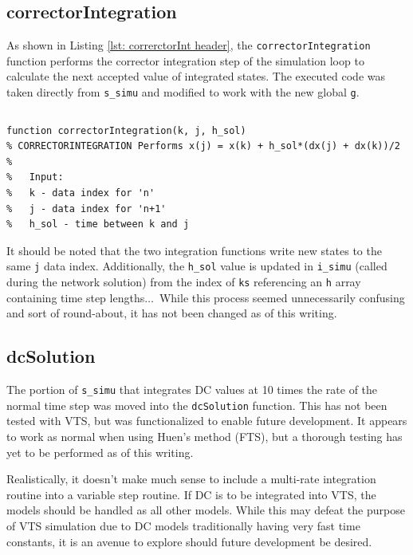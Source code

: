 \subsection{correctorIntegration}  
As shown in Listing \ref{lst: correrctorInt header}, the \verb|correctorIntegration| function performs the corrector integration step of the simulation loop to calculate the next accepted value of integrated states.
The executed code was taken directly from \verb|s_simu| and modified to work with the new global \verb|g|.
\pagebreak
\begin{lstlisting}[caption={Function Header for correctorIntegration},label={lst: correrctorInt header}]
\end{lstlisting}\vspace{-2 em}
\begin{verbatim}
function correctorIntegration(k, j, h_sol)
% CORRECTORINTEGRATION Performs x(j) = x(k) + h_sol*(dx(j) + dx(k))/2
%
%   Input:
%   k - data index for 'n'
%   j - data index for 'n+1'
%   h_sol - time between k and j
\end{verbatim}

It should be noted that the two integration functions write new states to the same \verb|j| data index.
Additionally, the \verb|h_sol| value is updated in \verb|i_simu| (called during the network solution) from the index of \verb|ks| referencing an \verb|h| array containing time step lengths$\ldots$\ 
While this process seemed unnecessarily confusing and sort of  round-about, it has not been changed as of this writing.

\subsection{dcSolution}  
The portion of \verb|s_simu| that integrates DC values at 10 times the rate of the normal time step was moved into the \verb|dcSolution| function.
This has not been tested with VTS, but was functionalized to enable future development.
It appears to work as normal when using Huen's method (FTS), but a thorough testing has yet to be performed as of this writing.

Realistically, it doesn't make much sense to include a multi-rate integration routine into a variable step routine.
If DC is to be integrated into VTS, the models should be handled as all other models.
While this may defeat the purpose of VTS simulation due to DC models traditionally having very fast time constants, it is an avenue to explore should future development be desired.

